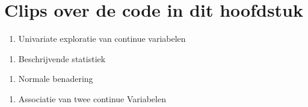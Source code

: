 \documentclass[
  12pt,dutch,coursenotes]{book}
\providecommand{\tightlist}{%
  \setlength{\itemsep}{0pt}\setlength{\parskip}{0pt}}
\theoremstyle{definition}
\theoremstyle{definition}
\theoremstyle{definition}
\theoremstyle{remark}
\begin{document}
\hypertarget{clips-over-de-code-in-dit-hoofdstuk}{%
\section{Clips over de code in dit hoofdstuk}\label{clips-over-de-code-in-dit-hoofdstuk}}

\begin{enumerate}
\def\labelenumi{\arabic{enumi}.}
\tightlist
\item
  Univariate exploratie van continue variabelen
\end{enumerate}

\begin{enumerate}
\def\labelenumi{\arabic{enumi}.}
\setcounter{enumi}{1}
\tightlist
\item
  Beschrijvende statistiek
\end{enumerate}

\begin{enumerate}
\def\labelenumi{\arabic{enumi}.}
\setcounter{enumi}{2}
\tightlist
\item
  Normale benadering
\end{enumerate}

\begin{enumerate}
\def\labelenumi{\arabic{enumi}.}
\setcounter{enumi}{3}
\tightlist
\item
  Associatie van twee continue Variabelen
\end{enumerate}

  
\end{document}
